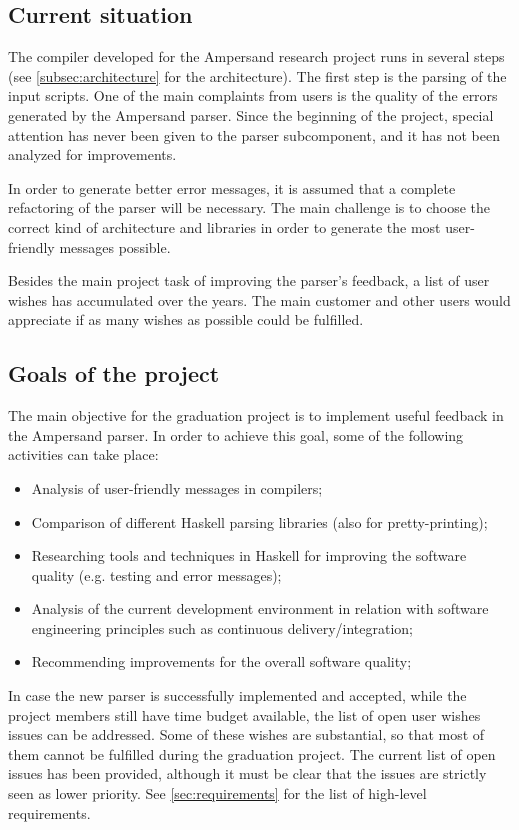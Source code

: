 \subsection{Current situation}
The compiler developed for the Ampersand research project runs in several steps (see \autoref{subsec:architecture} for the architecture).
The first step is the parsing of the input scripts.
One of the main complaints from users is the quality of the errors generated by the Ampersand parser.
Since the beginning of the project, special attention has never been given to the parser subcomponent, and it has not been analyzed for improvements.

In order to generate better error messages, it is assumed that a complete refactoring of the parser will be necessary.
The main challenge is to choose the correct kind of architecture and libraries in order to generate the most user-friendly messages possible.

Besides the main project task of improving the parser's feedback, a list of user wishes has accumulated over the years.
The main customer and other users would appreciate if as many wishes as possible could be fulfilled.

\subsection{Goals of the project}
\label{subsec:project-goals}
The main objective for the graduation project is to implement useful feedback in the Ampersand parser.
In order to achieve this goal, some of the following activities can take place:
\begin{itemize}
	\item Analysis of user-friendly messages in compilers;
	\item Comparison of different Haskell parsing libraries (also for pretty-printing);
	\item Researching tools and techniques in Haskell for improving the software quality (e.g. testing and error messages);
	\item Analysis of the current development environment in relation with software engineering principles such as continuous delivery/integration;
	\item Recommending improvements for the overall software quality;
\end{itemize}
%
In case the new parser is successfully implemented and accepted, while the project members still have time budget available, the list of open user wishes issues can be addressed.
Some of these wishes are substantial, so that most of them cannot be fulfilled during the graduation project.
The current list of open issues has been provided\cite{open-issues}, although it must be clear that the issues are strictly seen as lower priority.
See \autoref{sec:requirements} for the list of high-level requirements.

